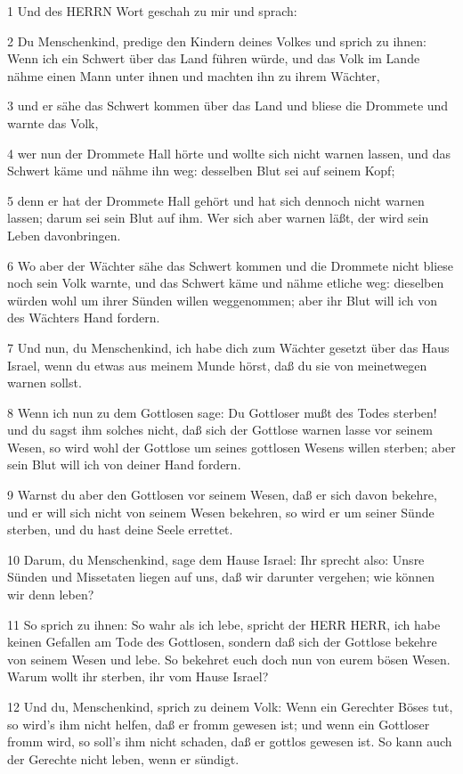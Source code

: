 \par 1 Und des HERRN Wort geschah zu mir und sprach:
\par 2 Du Menschenkind, predige den Kindern deines Volkes und sprich zu ihnen: Wenn ich ein Schwert über das Land führen würde, und das Volk im Lande nähme einen Mann unter ihnen und machten ihn zu ihrem Wächter,
\par 3 und er sähe das Schwert kommen über das Land und bliese die Drommete und warnte das Volk,
\par 4 wer nun der Drommete Hall hörte und wollte sich nicht warnen lassen, und das Schwert käme und nähme ihn weg: desselben Blut sei auf seinem Kopf;
\par 5 denn er hat der Drommete Hall gehört und hat sich dennoch nicht warnen lassen; darum sei sein Blut auf ihm. Wer sich aber warnen läßt, der wird sein Leben davonbringen.
\par 6 Wo aber der Wächter sähe das Schwert kommen und die Drommete nicht bliese noch sein Volk warnte, und das Schwert käme und nähme etliche weg: dieselben würden wohl um ihrer Sünden willen weggenommen; aber ihr Blut will ich von des Wächters Hand fordern.
\par 7 Und nun, du Menschenkind, ich habe dich zum Wächter gesetzt über das Haus Israel, wenn du etwas aus meinem Munde hörst, daß du sie von meinetwegen warnen sollst.
\par 8 Wenn ich nun zu dem Gottlosen sage: Du Gottloser mußt des Todes sterben! und du sagst ihm solches nicht, daß sich der Gottlose warnen lasse vor seinem Wesen, so wird wohl der Gottlose um seines gottlosen Wesens willen sterben; aber sein Blut will ich von deiner Hand fordern.
\par 9 Warnst du aber den Gottlosen vor seinem Wesen, daß er sich davon bekehre, und er will sich nicht von seinem Wesen bekehren, so wird er um seiner Sünde sterben, und du hast deine Seele errettet.
\par 10 Darum, du Menschenkind, sage dem Hause Israel: Ihr sprecht also: Unsre Sünden und Missetaten liegen auf uns, daß wir darunter vergehen; wie können wir denn leben?
\par 11 So sprich zu ihnen: So wahr als ich lebe, spricht der HERR HERR, ich habe keinen Gefallen am Tode des Gottlosen, sondern daß sich der Gottlose bekehre von seinem Wesen und lebe. So bekehret euch doch nun von eurem bösen Wesen. Warum wollt ihr sterben, ihr vom Hause Israel?
\par 12 Und du, Menschenkind, sprich zu deinem Volk: Wenn ein Gerechter Böses tut, so wird's ihm nicht helfen, daß er fromm gewesen ist; und wenn ein Gottloser fromm wird, so soll's ihm nicht schaden, daß er gottlos gewesen ist. So kann auch der Gerechte nicht leben, wenn er sündigt.
